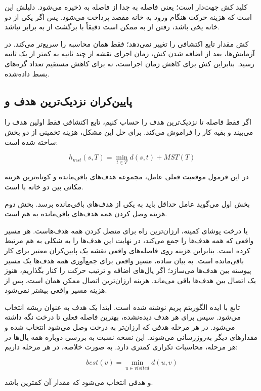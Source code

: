 \documentclass[10.5pt]{exam}
\begin{document}
کلید کش جهت‌دار است؛ یعنی فاصله
به
جدا از فاصله
به
ذخیره می‌شود. دلیلش این است که هزینه حرکت هنگام ورود به خانه مقصد پرداخت می‌شود. پس اگر یکی از دو خانه یخی باشد، رفتن از
به
ممکن است دقیقاً با برگشت از
به
برابر نباشد.

کش مقدار تابع اکتشافی را تغییر نمی‌دهد؛ فقط همان محاسبه را سریع‌تر می‌کند. در آزمایش‌ها، بعد از اضافه شدن کش، زمان اجرای نقشه
از چند ثانیه به کمتر از یک ثانیه رسید.
بنابراین کش برای کاهش زمان اجراست، نه برای کاهش مستقیم تعداد گره‌های بسط داده‌شده.

\subsection{پایین‌کران نزدیک‌ترین هدف و }
اگر فقط فاصله تا نزدیک‌ترین هدف را حساب کنیم، تابع اکتشافی فقط اولین هدف را می‌بیند و بقیه کار را فراموش می‌کند. برای حل این مشکل، هزینه تخمینی از دو بخش ساخته شده است:

\[
    h_{mst}(s, T) =
    \min_{t \in T} d(s,t) + MST(T)
\]

در این فرمول
موقعیت فعلی عامل،
مجموعه هدف‌های باقی‌مانده و
کوتاه‌ترین هزینه مکانی بین دو خانه با
است.

بخش اول می‌گوید عامل حداقل باید به یکی از هدف‌های باقی‌مانده برسد. بخش دوم هزینه وصل کردن همه هدف‌های باقی‌مانده به هم است.

یا درخت پوشای کمینه، ارزان‌ترین راه برای متصل کردن همه هدف‌هاست. هر مسیر واقعی که همه هدف‌ها را جمع می‌کند، در نهایت این هدف‌ها را به شکلی به هم مرتبط کرده است. بنابراین هزینه
روی فاصله‌های واقعی نقشه یک پایین‌کران معتبر برای کار باقی‌مانده است.
به بیان ساده، مسیر واقعی برای جمع‌آوری همه هدف‌ها یک مسیر پیوسته بین هدف‌ها می‌سازد؛ اگر یال‌های اضافه و ترتیب حرکت را کنار بگذاریم، هنوز یک اتصال بین هدف‌ها باقی می‌ماند. هزینه ارزان‌ترین اتصال ممکن همان
است، پس از هزینه مسیر واقعی بیشتر نمی‌شود.

تابع
با ایده الگوریتم پریم نوشته شده است. ابتدا یک هدف به عنوان ریشه انتخاب می‌شود. سپس برای هر هدف دیده‌نشده، بهترین فاصله فعلی تا درخت نگه داشته می‌شود. در هر مرحله هدفی که ارزان‌تر به درخت وصل می‌شود انتخاب شده و مقدارهای دیگر به‌روزرسانی می‌شوند. این نسخه نسبت به بررسی دوباره همه یال‌ها در هر مرحله، محاسبات تکراری کمتری دارد.
به صورت خلاصه، در هر مرحله داریم:

\[
    best(v) = \min_{u \in visited} d(u,v)
\]

و هدفی انتخاب می‌شود که مقدار
آن کمترین باشد.
\end{document}
